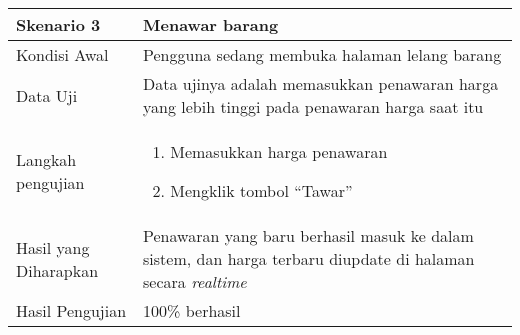 \begin{longtable}{|X|X|}
	\textbf{Skenario 3}
		& Menawar barang \\ \hline
	Kondisi Awal
		& Pengguna sedang membuka halaman lelang barang \\ \hline
	Data Uji
		& Data ujinya adalah memasukkan penawaran harga yang lebih tinggi pada penawaran harga saat itu \\ \hline
	Langkah pengujian
		& \begin{enumerate}
		\item Memasukkan harga penawaran
		\item Mengklik tombol ``Tawar''
	\end{enumerate} \\ \hline
	Hasil yang Diharapkan
		& Penawaran yang baru berhasil masuk ke dalam sistem, dan harga terbaru diupdate di halaman secara \textit{realtime} \\ \hline
	Hasil Pengujian
		& 100\% berhasil \\ \hline	
		
\end{longtable}